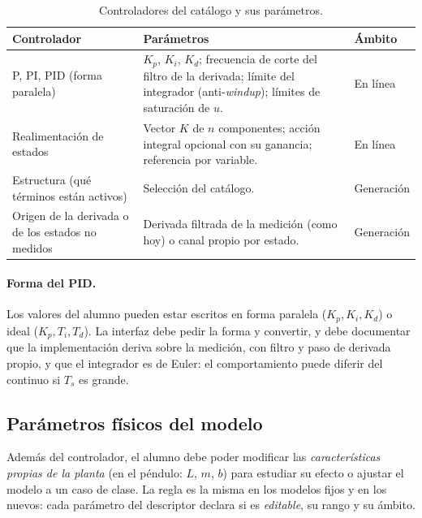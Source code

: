 \documentclass[12pt,letterpaper]{article}
\begin{document}
\begin{table}[!htbp]
\centering
\caption{Controladores del catálogo y sus parámetros.}
\label{tab:ctrl}
\begin{tabularx}{\textwidth}{>{\raggedright\arraybackslash}p{3.2cm}Y>{\raggedright\arraybackslash}p{1.9cm}}
\toprule
\textbf{Controlador} & \textbf{Parámetros} & \textbf{Ámbito} \\
\midrule
P, PI, PID (forma paralela) & $K_p$, $K_i$, $K_d$; frecuencia de corte del filtro de la derivada; límite del integrador (anti-\textit{windup}); límites de saturación de $u$. & En línea \\
Realimentación de estados & Vector $K$ de $n$ componentes; acción integral opcional con su ganancia; referencia por variable. & En línea \\
Estructura (qué términos están activos) & Selección del catálogo. & Generación \\
Origen de la derivada o de los estados no medidos & Derivada filtrada de la medición (como hoy) o canal propio por estado. & Generación \\
\bottomrule
\end{tabularx}
\end{table}

\paragraph{Forma del PID.} Los valores del alumno pueden estar escritos en forma paralela ($K_p,K_i,K_d$) o ideal ($K_p, T_i, T_d$). La interfaz debe pedir la forma y convertir, y debe documentar que la implementación deriva sobre la medición, con filtro y paso de derivada propio, y que el integrador es de Euler: el comportamiento puede diferir del continuo si $T_s$ es grande.

\subsection{Parámetros físicos del modelo}
\label{sec:paramfis}

Además del controlador, el alumno debe poder modificar las \emph{características propias de la planta} (en el péndulo: $L$, $m$, $b$) para estudiar su efecto o ajustar el modelo a un caso de clase. La regla es la misma en los modelos fijos y en los nuevos: cada parámetro del descriptor declara si es \emph{editable}, su rango y su ámbito.
\end{document}
